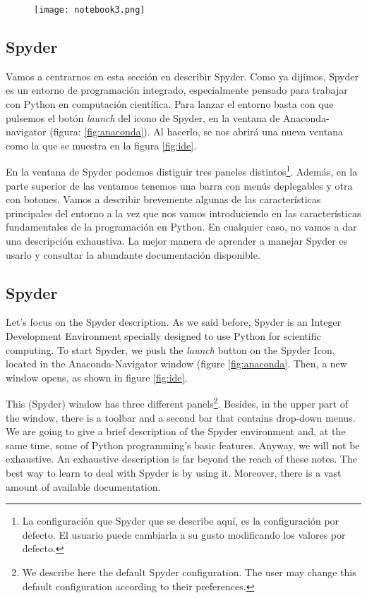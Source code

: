 \begin{figure}
\centering
    \texttt{[image: notebook3.png]}
    \label{fig:ntb3}
\end{figure} 

\begin{paracol}{2}
\subsection{Spyder}
Vamos a centrarnos en esta sección en describir Spyder. Como ya dijimos, Spyder es un entorno de programación integrado, especialmente pensado para trabajar con Python en computación científica. Para lanzar el entorno basta con que pulsemos el botón \emph{launch} del icono de Spyder, en la ventana de Anaconda-navigator (figura: \ref{fig:anaconda}). Al hacerlo, se nos abrirá una nueva ventana como la que se muestra en la figura \ref{fig:ide}.

En la ventana de Spyder podemos distiguir tres paneles distintos\footnote{La configuración que Spyder que se describe  aquí, es la configuración por defecto. El usuario puede cambiarla a su gusto modificando los valores por defecto.}. Además, en la  parte superior de las ventamos tenemos una barra con menús deplegables y otra con botones. Vamos a describir brevemente algunas de las características principales del entorno a la vez que nos vamos introduciendo en las características fundamentales de la programación en Python. En cualquier caso, no vamos a dar una descripción exhaustiva. La mejor manera de aprender a manejar Spyder es usarlo y consultar la abundante documentación disponible.
\switchcolumn

\subsection{Spyder}
Let's focus on the Spyder description. As we said before, Spyder is an Integer Development Environment specially designed to use Python for scientific computing. To start Spyder, we push the \emph{launch} button on the Spyder Icon, located in the Anaconda-Navigator window (figure \ref{fig:anaconda}. Then, a new window opens, as shown in figure \ref{fig:ide}.

This (Spyder) window has three different panels\footnote{We describe here the default Spyder configuration. The user may change this default configuration according to their preferences.}. Besides, in the upper part of the window, there is a toolbar and a second bar that contains drop-down menus. We are going to give a brief description of the Spyder environment and, at the same time, some of Python programming's basic features. Anyway, we will not be exhaustive. An exhaustive description is far beyond the reach of these notes. The best way to learn to deal with Spyder is by using it. Moreover, there is a vast amount of available documentation.
\end{paracol}

